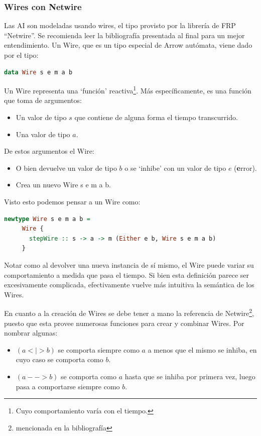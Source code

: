 \documentclass[12pt]{article}
\begin{document}
\subsubsection{Wires con Netwire}
Las AI son modeladas usando wires, el tipo provisto por la librería de FRP ``Netwire''. Se recomienda leer la bibliografía presentada al final para un mejor entendimiento. Un Wire, que es un tipo especial de Arrow autómata, viene dado por el tipo:
\begin{lstlisting}[language=haskell]
data Wire s e m a b
\end{lstlisting}
Un Wire representa una `función' reactiva\footnote{Cuyo comportamiento varía con el tiempo.}. Más específicamente, es una función que toma de argumentos:
\begin{itemize}
\item Un valor de tipo $s$ que contiene de alguna forma el tiempo transcurrido.
\item Una valor de tipo $a$.
\end{itemize}
De estos argumentos el Wire:
\begin{itemize}
\item O bien devuelve un valor de tipo $b$ o se `inhibe' con un valor de tipo $e$ (\textbf{e}rror).
\item Crea un nuevo Wire s e m a b.
\end{itemize}
Visto esto podemos pensar a un Wire como:
\begin{lstlisting}[language=haskell]
 newtype Wire s e m a b =
     Wire {
       stepWire :: s -> a -> m (Either e b, Wire s e m a b)
     }
\end{lstlisting}
Notar como al devolver una nueva instancia de sí mismo, el Wire puede variar su comportamiento a medida que pasa el tiempo. Si bien esta definición parece ser excesivamente complicada, efectivamente vuelve más intuitiva la semántica de los Wires.



En cuanto a la creación de Wires se debe tener a mano la referencia de Netwire\footnote{mencionada en la bibliografía}, puesto que esta provee numerosas funciones para crear y combinar Wires. Por nombrar algunas:
\begin{itemize}
\item $(a<|>b)$ se comporta siempre como $a$ a menos que el mismo se inhiba, en cuyo caso se comporta como $b$.
\item $(a-->b)$ se comporta como $a$ hasta que se inhiba por primera vez, luego pasa a comportarse siempre como $b$.
\end{itemize}
\end{document}
